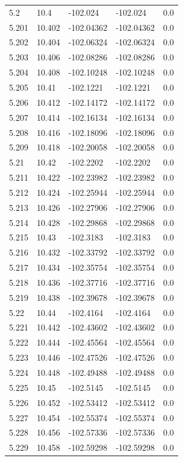 \begin{tabular}{lllll}
5.2 & 10.4 & -102.024 & -102.024 & 0.0 \\
5.201 & 10.402 & -102.04362 & -102.04362 & 0.0 \\
5.202 & 10.404 & -102.06324 & -102.06324 & 0.0 \\
5.203 & 10.406 & -102.08286 & -102.08286 & 0.0 \\
5.204 & 10.408 & -102.10248 & -102.10248 & 0.0 \\
5.205 & 10.41 & -102.1221 & -102.1221 & 0.0 \\
5.206 & 10.412 & -102.14172 & -102.14172 & 0.0 \\
5.207 & 10.414 & -102.16134 & -102.16134 & 0.0 \\
5.208 & 10.416 & -102.18096 & -102.18096 & 0.0 \\
5.209 & 10.418 & -102.20058 & -102.20058 & 0.0 \\
5.21 & 10.42 & -102.2202 & -102.2202 & 0.0 \\
5.211 & 10.422 & -102.23982 & -102.23982 & 0.0 \\
5.212 & 10.424 & -102.25944 & -102.25944 & 0.0 \\
5.213 & 10.426 & -102.27906 & -102.27906 & 0.0 \\
5.214 & 10.428 & -102.29868 & -102.29868 & 0.0 \\
5.215 & 10.43 & -102.3183 & -102.3183 & 0.0 \\
5.216 & 10.432 & -102.33792 & -102.33792 & 0.0 \\
5.217 & 10.434 & -102.35754 & -102.35754 & 0.0 \\
5.218 & 10.436 & -102.37716 & -102.37716 & 0.0 \\
5.219 & 10.438 & -102.39678 & -102.39678 & 0.0 \\
5.22 & 10.44 & -102.4164 & -102.4164 & 0.0 \\
5.221 & 10.442 & -102.43602 & -102.43602 & 0.0 \\
5.222 & 10.444 & -102.45564 & -102.45564 & 0.0 \\
5.223 & 10.446 & -102.47526 & -102.47526 & 0.0 \\
5.224 & 10.448 & -102.49488 & -102.49488 & 0.0 \\
5.225 & 10.45 & -102.5145 & -102.5145 & 0.0 \\
5.226 & 10.452 & -102.53412 & -102.53412 & 0.0 \\
5.227 & 10.454 & -102.55374 & -102.55374 & 0.0 \\
5.228 & 10.456 & -102.57336 & -102.57336 & 0.0 \\
5.229 & 10.458 & -102.59298 & -102.59298 & 0.0 \\

\end{tabular}
